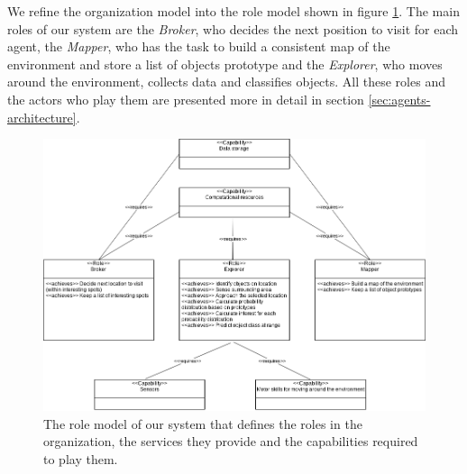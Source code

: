 \documentclass[a4paper, 10pt, conference]{ieeeconf}      %
\begin{document}
We refine the organization model into the role model shown in figure \ref{fig:role-model}. The main roles of our system are the \emph{Broker}, who decides the next position to visit for each agent, the \emph{Mapper}, who has the task to build a consistent map of the environment and store a list of objects prototype and the \emph{Explorer}, who moves around the environment, collects data and classifies objects. All these roles and the actors who play them are presented more in detail in section \ref{sec:agents-architecture}.
\begin{figure}[htb]
	\centering
	\includegraphics[width=1\linewidth]{img/role-model.png}
	\caption{The role model of our system that defines the roles in the organization, the services they provide and the capabilities required to play them.}
	\label{fig:role-model}
\end{figure}
\end{document}
